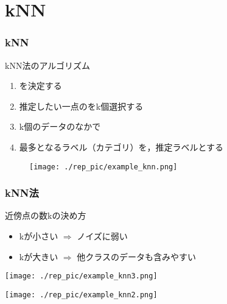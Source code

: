 \documentclass[dvipdfmx]{beamer}
\begin{document}
\section{kNN}
\begin{frame}
  \frametitle{kNN}
  kNN法のアルゴリズム
  \begin{enumerate}
    \item {}を決定する
    \item 推定したい一点のをk個選択する
    \item k個のデータのなかで
    \item 最多となるラベル（カテゴリ）を，推定ラベルとする
  \end{enumerate}
  \begin{center}
    \begin{figure}
      \texttt{[image: ./rep\_pic/example\_knn.png]}
    \end{figure}
  \end{center}
\end{frame}

\begin{frame}
  \frametitle{kNN法}
  近傍点の数kの決め方
  \begin{itemize}
    \item kが小さい $ \Rightarrow $ ノイズに弱い
    \item kが大きい $ \Rightarrow $ 他クラスのデータも含みやすい
  \end{itemize}
  \begin{center}
    \begin{minipage}{0.45\columnwidth}
      \centering
      \texttt{[image: ./rep\_pic/example\_knn3.png]}
    \end{minipage}
    \begin{minipage}{0.45\columnwidth}
      \centering
      \texttt{[image: ./rep\_pic/example\_knn2.png]}
    \end{minipage}
  \end{center}
\end{frame}
\end{document}
